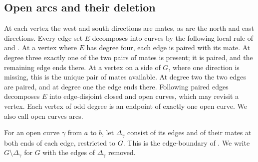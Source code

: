 \subsection{Open arcs and their deletion}
At each vertex the west and south directions are mates, as are the north and east directions. Every edge set $E$ decomposes into curves by the following local rule of \cite[Section~6.1]{PV99} and \cite[Appendix~A.2]{CV}. At a vertex where $E$ has degree four, each edge is paired with its mate. At degree three exactly one of the two pairs of mates is present; it is paired, and the remaining edge ends there. At a vertex on a side of $G$, where one direction is missing, this is the unique pair of mates available. At degree two the two edges are paired, and at degree one the edge ends there. Following paired edges decomposes $E$ into edge-disjoint closed and open curves, which may revisit a vertex. Each vertex of odd degree is an endpoint of exactly one open curve. We also call open curves arcs.

For an open curve $\gamma$ from $a$ to $b$, let $\Delta_\gamma$ consist of its edges and of their mates at both ends of each edge, restricted to $G$. This is the edge-boundary of \cite[Lemma~6.1 and (6.8)]{PV99}. We write $G\setminus\Delta_\gamma$ for $G$ with the edges of $\Delta_\gamma$ removed.

